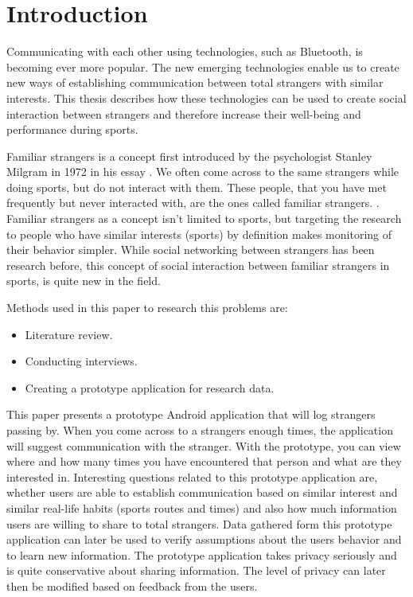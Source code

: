 
\section{Introduction}

Communicating with each other using technologies, such as Bluetooth, is becoming ever more popular. The new emerging technologies enable us to create new ways of establishing communication between total strangers with similar interests. This thesis describes how these technologies can be used to create social interaction between strangers and therefore increase their well-being and performance during sports.

Familiar strangers is a concept first introduced by the psychologist Stanley Milgram in 1972 in his essay \citep{milgram1992}. We often come across to the same strangers while doing sports, but do not interact with them. These people, that you have met frequently but never interacted with, are the ones called familiar strangers. \citep{familiarStranger}. Familiar strangers as a concept isn't limited to sports, but targeting the research to people who have similar interests (sports) by definition makes monitoring of their behavior simpler. While social networking between strangers has been research before, this concept of social interaction between familiar strangers in sports, is quite new in the field.

Methods used in this paper to research this problems are:
\begin{itemize}
\item  Literature review.
\item Conducting interviews.
\item Creating a prototype application for research data.
\end{itemize}

This paper presents a prototype Android application that will log strangers passing by. When you come across to a strangers enough times, the application will suggest communication with the stranger. With the prototype, you can view where and how many times you have encountered that person and what are they interested in. Interesting questions related to this prototype application are, whether users are able to establish communication based on similar interest and similar real-life habits (sports routes and times) and also how much information users are willing to share to total strangers. Data gathered form this prototype application can later be used to verify assumptions about the users behavior and to learn new information. The prototype application takes privacy seriously and is quite conservative about sharing information. The level of privacy can later then be modified based on feedback from the users.

